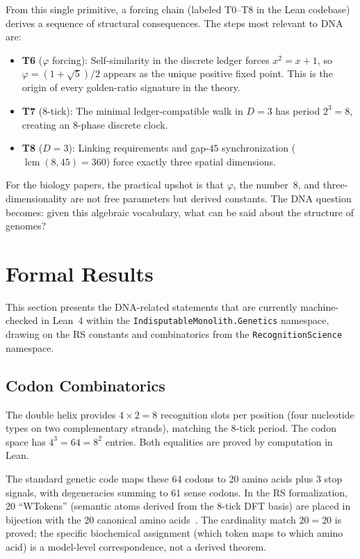 \documentclass[11pt,a4paper]{article}
\newcommand{\ph}{\varphi}
\begin{document}
From this single primitive, a forcing chain (labeled T0--T8 in the Lean codebase) derives a sequence of structural consequences. The steps most relevant to DNA are:
\begin{itemize}[nosep]
\item \textbf{T6} ($\ph$ forcing): Self-similarity in the discrete ledger forces $x^2 = x+1$, so $\ph = (1+\sqrt{5})/2$ appears as the unique positive fixed point. This is the origin of every golden-ratio signature in the theory.
\item \textbf{T7} (8-tick): The minimal ledger-compatible walk in $D=3$ has period $2^3 = 8$, creating an 8-phase discrete clock.
\item \textbf{T8} ($D=3$): Linking requirements and gap-$45$ synchronization ($\operatorname{lcm}(8,45)=360$) force exactly three spatial dimensions.
\end{itemize}

For the biology papers, the practical upshot is that $\ph$, the number~$8$, and three-dimensionality are not free parameters but derived constants. The DNA question becomes: given this algebraic vocabulary, what can be said about the structure of genomes?

\section{Formal Results}
\label{sec:formal}

This section presents the DNA-related statements that are currently machine-checked in Lean~4 within the \texttt{IndisputableMonolith.Genetics} namespace, drawing on the RS constants and combinatorics from the \texttt{RecognitionScience} namespace.

\subsection{Codon Combinatorics}

The double helix provides $4 \times 2 = 8$ recognition slots per position (four nucleotide types on two complementary strands), matching the 8-tick period. The codon space has $4^3 = 64 = 8^2$ entries. Both equalities are proved by computation in Lean.

The standard genetic code maps these 64 codons to 20 amino acids plus 3 stop signals, with degeneracies summing to 61 sense codons. In the RS formalization, 20 ``WTokens'' (semantic atoms derived from the 8-tick DFT basis) are placed in bijection with the 20 canonical amino acids~\cite{Washburn2025}. The cardinality match $20 = 20$ is proved; the specific biochemical assignment (which token maps to which amino acid) is a model-level correspondence, not a derived theorem.
\end{document}
